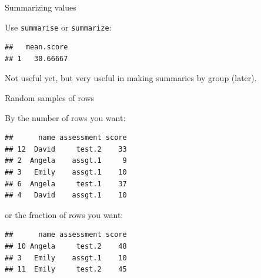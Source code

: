 \begin{frame}[fragile]{Summarizing values}
  
  Use \texttt{summarise} or \texttt{summarize}:
  
\begin{knitrout}
\color{fgcolor}\begin{kframe}
\begin{alltt}
\hlstd{=}
\end{alltt}
\begin{verbatim}
##   mean.score
## 1   30.66667
\end{verbatim}
\end{kframe}
\end{knitrout}

Not useful yet, but very useful in making summaries by group (later).
  
\end{frame}

\begin{frame}[fragile]{Random samples of rows}
  


By the number of rows you want:

\begin{knitrout}
\color{fgcolor}\begin{kframe}
\begin{alltt}
\hlstd{)}
\end{alltt}
\begin{verbatim}
##      name assessment score
## 12  David     test.2    33
## 2  Angela    assgt.1     9
## 3   Emily    assgt.1    10
## 6  Angela     test.1    37
## 4   David    assgt.1    10
\end{verbatim}
\end{kframe}
\end{knitrout}

or the fraction of rows you want:

\begin{knitrout}
\color{fgcolor}\begin{kframe}
\begin{alltt}
\hlstd{)}
\end{alltt}
\begin{verbatim}
##      name assessment score
## 10 Angela     test.2    48
## 3   Emily    assgt.1    10
## 11  Emily     test.2    45
\end{verbatim}
\end{kframe}
\end{knitrout}
  
\end{frame}


